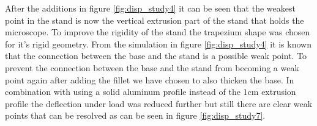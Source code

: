 \documentclass[10pt]{article}
\begin{document}
After the additions in figure \ref{fig:disp_study4} it can be seen that the weakest point in the stand is now the vertical extrusion part of the stand that holds the microscope. 
To improve the rigidity of the stand the trapezium shape was chosen for it's rigid geometry.
From the simulation in figure \ref{fig:disp_study4} it is known that the connection between the base and the stand is a possible weak point. 
To prevent the connection between the base and the stand from becoming a weak point again after adding the fillet we have chosen to also thicken the base.
In combination with using a solid aluminum profile instead of the $1 \mathrm{cm}$ extrusion profile the deflection under load was reduced further but still there are clear weak points that can be resolved as can be seen in figure \ref{fig:disp_study7}.\\
\end{document}
